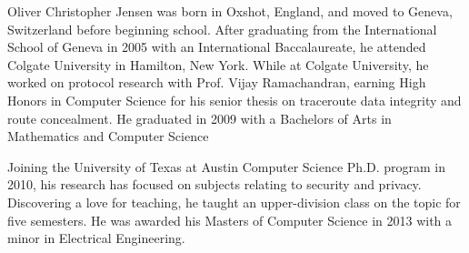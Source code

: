 Oliver Christopher Jensen was born in Oxshot, England, and moved to Geneva, Switzerland before beginning school.
After graduating from the International School of Geneva in 2005 with an International Baccalaureate,
    he attended Colgate University in Hamilton, New York.
While at Colgate University, he worked on protocol research with Prof. Vijay Ramachandran,
    earning High Honors in Computer Science for his senior thesis on traceroute data integrity and route concealment.
He graduated in 2009 with a Bachelors of Arts in Mathematics and Computer Science

Joining the University of Texas at Austin Computer Science Ph.D. program in 2010,
    his research has focused on subjects relating to security and privacy.
Discovering a love for teaching, he taught an upper-division class on the topic for five semesters.
He was awarded his Masters of Computer Science in 2013 with a minor in Electrical Engineering.